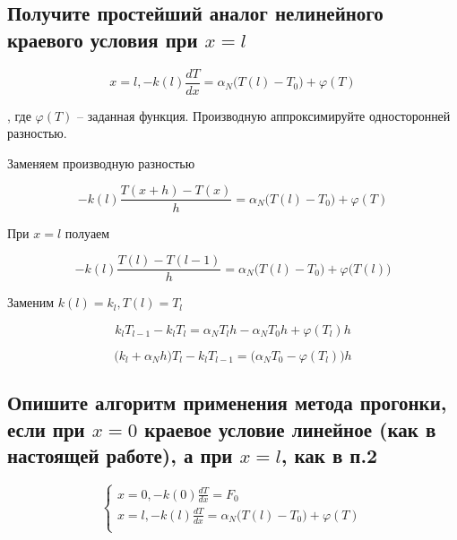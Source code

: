 \subsection{Получите простейший аналог нелинейного краевого условия при $x = l$}

\begin{equation*}
    x = l, -k(l) \frac{dT}{dx} = \alpha_N \big( T(l) - T_0 \big) + \varphi(T)
\end{equation*}

, где $\varphi(T)$ -- заданная функция. Производную аппроксимируйте односторонней разностью.

Заменяем производную разностью

\begin{equation*}
    -k(l) \frac{T(x + h) - T(x)}{h} = \alpha_N \big( T(l) - T_0 \big) + \varphi(T)
\end{equation*}

При $x = l$ полуаем

\begin{equation*}
    -k(l) \frac{T(l) - T(l-1)}{h} = \alpha_N \big(T(l) - T_0 \big) +
    \varphi \big(T(l) \big)
\end{equation*}

Заменим $k(l) = k_l, T(l) = T_l$

\begin{equation*}
    k_l T_{l-1} - k_l T_l = \alpha_N T_l h - \alpha_NT_0 h + \varphi(T_l) h
\end{equation*}

\begin{equation*}
    \big( k_l + \alpha_N h \big) T_l - k_l T_{l-1} = \big( \alpha_NT_0 - \varphi(T_l) \big) h
\end{equation*}

\subsection{Опишите алгоритм применения метода прогонки, если при $x=0$ краевое условие линейное (как в настоящей работе), а при $x=l$, как в п.2}

\begin{equation*}
    \begin{cases}
        x = 0, -k(0) \frac{dT}{dx} = F_0 \\
        x = l, -k(l) \frac{dT}{dx} = \alpha_N\big(T(l) - T_0\big) + \varphi(T) \\
    \end{cases}
\end{equation*}


